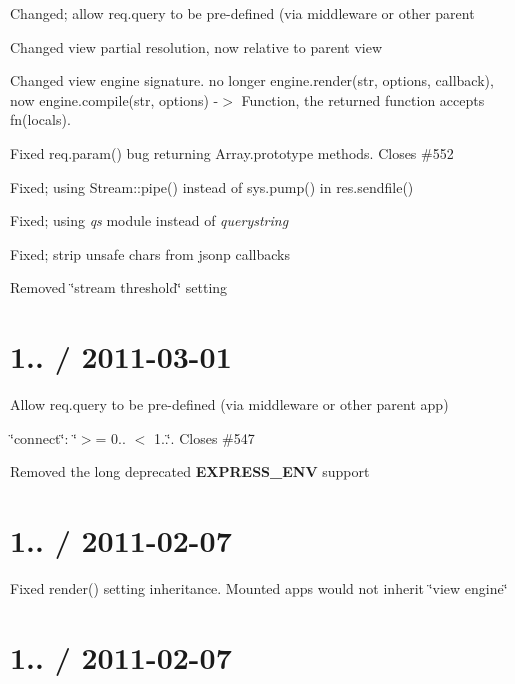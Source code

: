 \begin{DoxyItemize}
\item Changed; allow {\ttfamily req.\+query} to be pre-\/defined (via middleware or other parent
\item Changed view partial resolution, now relative to parent view
\item Changed view engine signature. no longer {\ttfamily engine.\+render(str, options, callback)}, now {\ttfamily engine.\+compile(str, options) -\/$>$ Function}, the returned function accepts {\ttfamily fn(locals)}.
\item Fixed {\ttfamily req.\+param()} bug returning Array.\+prototype methods. Closes \#552
\item Fixed; using {\ttfamily Stream\+::pipe()} instead of {\ttfamily sys.\+pump()} in {\ttfamily res.\+sendfile()}
\item Fixed; using {\itshape qs} module instead of {\itshape querystring}
\item Fixed; strip unsafe chars from jsonp callbacks
\item Removed \char`\"{}stream threshold\char`\"{} setting
\end{DoxyItemize}

\section*{1.. / 2011-\/03-\/01 }


\begin{DoxyItemize}
\item Allow {\ttfamily req.\+query} to be pre-\/defined (via middleware or other parent app)
\item \char`\"{}connect\char`\"{}\+: \char`\"{}$>$= 0.. $<$ 1..\char`\"{}. Closes \#547
\item Removed the long deprecated {\bfseries E\+X\+P\+R\+E\+S\+S\+\_\+\+E\+N\+V} support
\end{DoxyItemize}

\section*{1.. / 2011-\/02-\/07 }


\begin{DoxyItemize}
\item Fixed {\ttfamily render()} setting inheritance. Mounted apps would not inherit \char`\"{}view engine\char`\"{}
\end{DoxyItemize}

\section*{1.. / 2011-\/02-\/07 }


